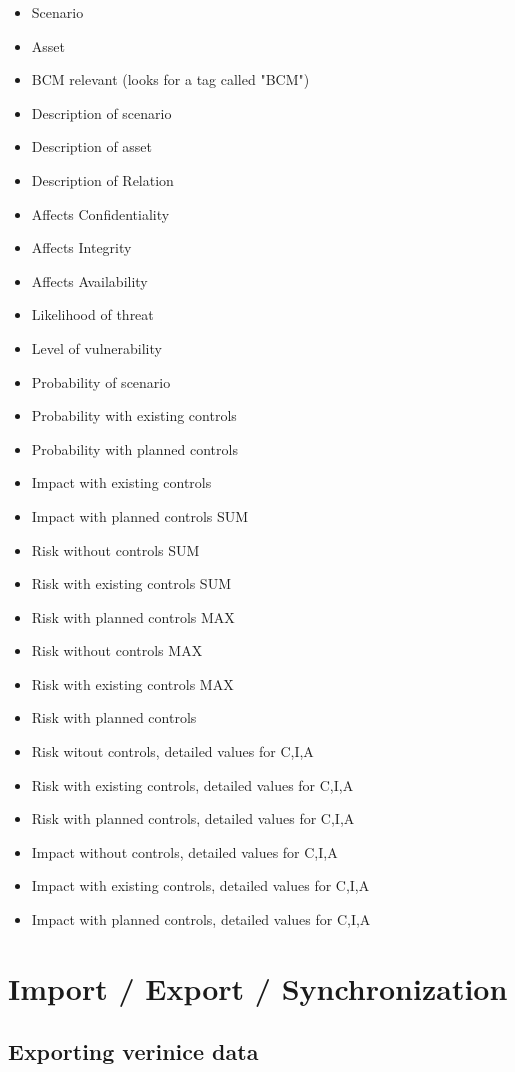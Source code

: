 \documentclass[a4paper,10pt]{book}
\begin{document}
\begin{itemize}
\item Scenario
\item Asset
\item BCM relevant (looks for a tag called "BCM")
\item Description of scenario
\item Description of asset
\item Description of Relation
\item Affects Confidentiality
\item Affects Integrity
\item Affects Availability
\item Likelihood of threat
\item Level of vulnerability
\item Probability of scenario
\item Probability with existing controls
\item Probability with planned controls
\item Impact with existing controls
\item Impact with planned controls SUM
\item Risk without controls SUM
\item Risk with existing controls SUM
\item Risk with planned controls MAX
\item Risk without controls MAX
\item Risk with existing controls MAX
\item Risk with planned controls
\item Risk witout controls, detailed values for C,I,A
\item Risk with existing controls, detailed values for C,I,A
\item Risk with planned controls, detailed values for C,I,A
\item Impact without controls, detailed values for C,I,A
\item Impact with existing controls, detailed values for C,I,A
\item Impact with planned controls, detailed values for C,I,A
\end{itemize}

\chapter{Import / Export / Synchronization}
\section{Exporting verinice data}
\label{sec:exporting-verinice-data}
\end{document}

